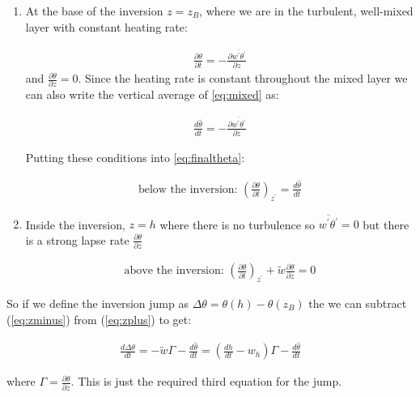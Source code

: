 \documentclass[12pt]{article}
\begin{document}
\begin{enumerate}
\item  At the base of the inversion  $z=z_B$, where we are
in the turbulent, well-mixed layer with constant heating rate:

\begin{gather}
\label{eq:mixed}
  \frac{ \partial  \theta}{ \partial t}  = - \frac{ \partial \overline{ w^\prime \theta^\prime}}{\partial z} 
\end{gather}
and $\frac{\partial \theta }{ \partial z} =0$.  Since the heating rate is constant throughout the
mixed layer we can also write the vertical average of \eqref{eq:mixed} as:

\begin{gather}
  \frac{ d  \widehat{\theta}}{ d t}  =  - \frac{\partial  \overline{ w^\prime \theta^\prime}}{\partial z} 
\end{gather}

Putting these conditions into \eqref{eq:finaltheta}:

\begin{gather}
\label{eq:zminus}
  \text{below the inversion: } \left (  \frac{ \partial \theta}{\partial t}  \right )_{z^\prime} =   \frac{ d  \widehat{\theta}}{ d t} 
\end{gather}


\item Inside the inversion, $z=h$ where there is no turbulence so $\overline{ w^\prime \theta^\prime}= 0$
but there is a strong lapse rate $\frac{ \partial \theta}{\partial z} $


\begin{gather}
\label{eq:zplus}
  \text{above the inversion: } \left (  \frac{ \partial \theta}{\partial t}  \right )_{z^\prime} + \widetilde{w} \frac{ \partial  \theta}{\partial z}  = 0
\end{gather}

\end{enumerate}

So if we define the inversion jump as $\Delta \theta = \theta (h) - \theta( z_B)$ the we can subtract (\ref{eq:zminus}) from
(\ref{eq:zplus}) to get:

\begin{gather}
  \label{eq:theend}
\frac{d \Delta \theta }{dt} = - \widetilde{w} \Gamma - \frac{ d  \widehat{\theta}}{ d t} =
\left (  \frac{dh }{dt}  - w_h  \right ) \Gamma - \frac{ d  \widehat{\theta}}{ d t}
\end{gather}

where $\Gamma = \frac{ \partial \theta}{\partial z}$.  This is just the required third equation for the jump.
\end{document}
